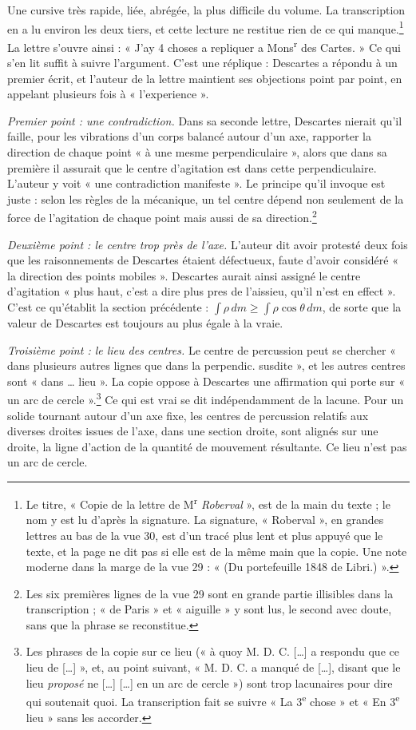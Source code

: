 \documentclass[11pt,a4paper]{article}
\begin{document}
Une cursive très rapide, liée, abrégée, la plus difficile du volume. La
transcription en a lu environ les deux tiers, et cette lecture ne restitue rien
de ce qui manque.\footnote{Le titre, « Copie de la lettre de M\textsuperscript{r}
\emph{Roberval} », est de la main du texte ; le nom y est lu d'après la
signature. La signature, « Roberval », en grandes lettres au bas de la vue 30,
est d'un tracé plus lent et plus appuyé que le texte, et la page ne dit pas si
elle est de la même main que la copie. Une note moderne dans la marge de la vue
29 : « (Du portefeuille 1848 de Libri.) ».} La lettre s'ouvre ainsi : « J'ay 4
choses a repliquer a Mons\textsuperscript{r} des Cartes. » Ce qui s'en lit
suffit à suivre l'argument. C'est une réplique : Descartes a répondu à un
premier écrit, et l'auteur de la lettre maintient ses objections point par
point, en appelant plusieurs fois à « l'experience ».

\emph{Premier point : une contradiction.} Dans sa seconde lettre, Descartes
nierait qu'il faille, pour les vibrations d'un corps balancé autour d'un axe,
rapporter la direction de chaque point « à une mesme perpendiculaire », alors
que dans sa première il assurait que le centre d'agitation est dans cette
perpendiculaire. L'auteur y voit « une contradiction manifeste ». Le principe
qu'il invoque est juste : selon les règles de la mécanique, un tel centre
dépend non seulement de la force de l'agitation de chaque point mais aussi de
sa direction.\footnote{Les six premières lignes de la vue 29 sont en grande
partie illisibles dans la transcription ; « de Paris » et « aiguille » y sont
lus, le second avec doute, sans que la phrase se reconstitue.}

\emph{Deuxième point : le centre trop près de l'axe.} L'auteur dit avoir
protesté deux fois que les raisonnements de Descartes étaient défectueux, faute
d'avoir considéré « la direction des points mobiles ». Descartes aurait ainsi
assigné le centre d'agitation « plus haut, c'est a dire plus pres de l'aissieu,
qu'il n'est en effect ». C'est ce qu'établit la section précédente :
\(\int\rho\,dm\ge\int\rho\cos\theta\,dm\), de sorte que la valeur de Descartes
est toujours au plus égale à la vraie.

\emph{Troisième point : le lieu des centres.} Le centre de percussion peut se
chercher « dans plusieurs autres lignes que dans la perpendic. susdite », et les
autres centres sont « dans \ldots{} lieu ». La copie oppose à Descartes une
affirmation qui porte sur « un arc de cercle ».\footnote{Les phrases de la copie
sur ce lieu (« à quoy M. D. C. [\ldots] a respondu que ce lieu de [\ldots] », et,
au point suivant, « M. D. C. a manqué de [\ldots], disant que le lieu
\emph{proposé} ne [\ldots] [\ldots] en un arc de cercle ») sont trop lacunaires
pour dire qui soutenait quoi. La transcription fait se suivre « La 3\textsuperscript{e}
chose » et « En 3\textsuperscript{e} lieu » sans les accorder.} Ce qui est vrai
se dit indépendamment de la lacune. Pour un solide tournant autour d'un axe
fixe, les centres de percussion relatifs aux diverses droites issues de l'axe,
dans une section droite, sont alignés sur une droite, la ligne d'action de la
quantité de mouvement résultante. Ce lieu n'est pas un arc de cercle.
\end{document}

